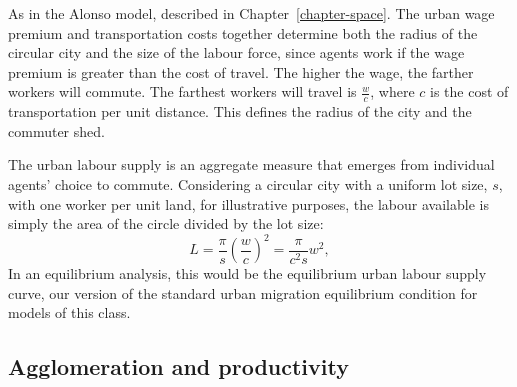 As in the Alonso model, described in Chapter~\ref{chapter-space}. The {urban wage premium} and transportation costs together determine both the radius of the circular city and the size of the labour force, %
since agents work if the wage premium is greater than the cost of travel. %
The higher the wage, the  farther workers will commute. %
The farthest workers will travel  is $\frac{w}{{c}}$, where ${c}$ is the cost of transportation per unit distance. This defines the radius of the city and the commuter shed.

The \gls{urban labour supply} is an \gls{aggregate} measure that emerges from individual agents' choice to commute. Considering a \gls{circular city} with a uniform lot size, $s$, with one worker per unit land, for illustrative purposes, the labour available is simply the area of the circle divided by the lot size: 
\begin{equation}
 L = \frac{\pi}{s} \left(\frac{w}{{c}}\right)^2
   =\frac{\pi}{{c}^2 s} w^2,
\label{eqn-labour-supply1}
\end{equation}
In an equilibrium analysis, this would be the equilibrium \gls{urban labour supply} curve, our version of the standard urban \gls{migration equilibrium} condition for models of this class. %


\subsection{Agglomeration and productivity}\label{sec:Production-fn}

